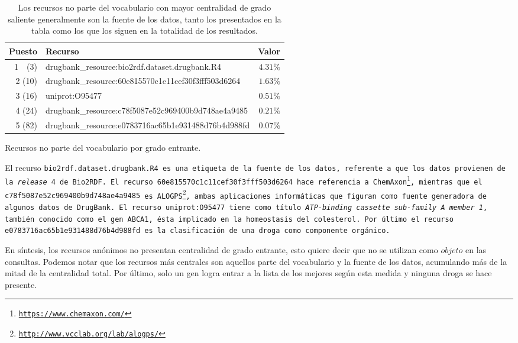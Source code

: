 \begin{table}[h!]
  \centering
  \begin{tabular}{|r|l|r|}\hline
    \bf{Puesto} & \bf{Recurso} & \bf{Valor} \\\hline
    1~~(3) & drugbank\_resource:bio2rdf.dataset.drugbank.R4			 & $4.31\%$ \\\hline
    2 (10) & drugbank\_resource:60e815570c1c11cef30f3fff503d6264 & $1.63\%$ \\\hline
    3 (16) & uniprot:O95477                                      & $0.51\%$ \\\hline
    4 (24) & drugbank\_resource:c78f5087e52c969400b9d748ae4a9485 & $0.21\%$ \\\hline
    5 (82) & drugbank\_resource:e0783716ac65b1e931488d76b4d988fd & $0.07\%$ \\\hline
  \end{tabular}
  \caption{Recursos no parte del vocabulario por grado entrante.}
  \label{tab:idct5}
  \vspace{-.2cm}
  \caption*{\small
    Los recursos no parte del vocabulario con mayor centralidad de grado
    saliente generalmente son la fuente de los datos, tanto los presentados en
    la tabla como los que los siguen en la totalidad de los resultados.
  }
\end{table}

El recurso \tt{bio2rdf.dataset.drugbank.R4} es una etiqueta de la fuente de los
datos, referente a que los datos provienen de la \emph{release} 4 de Bio2RDF.
El recurso \tt{60e815570c1c11cef30f3fff503d6264} hace referencia a 
ChemAxon\footnote{\url{https://www.chemaxon.com/}},
mientras que el \tt{c78f5087e52c969400b9d748ae4a9485} es 
ALOGPS\footnote{\url{http://www.vcclab.org/lab/alogps/}}, ambas aplicaciones
informáticas que figuran como fuente generadora de algunos datos de DrugBank.
El recurso \tt{uniprot:O95477} tiene como título \emph{ATP-binding cassette
sub-family A member 1}, también conocido como el gen ABCA1, ésta implicado en
la homeostasis del colesterol.
Por último el recurso 
\tt{e0783716ac65b1e931488d76b4d988fd} es la clasificación de una droga como
componente orgánico.

En síntesis, los recursos anónimos no presentan centralidad de grado entrante,
esto quiere decir que no se utilizan como $objeto$ en las consultas.
Podemos notar que los recursos más centrales son aquellos parte del
vocabulario y la fuente de los datos, acumulando más de la mitad de la
centralidad total.
Por último, solo un gen logra entrar a la lista de los mejores según esta medida
y ninguna droga se hace presente. 

